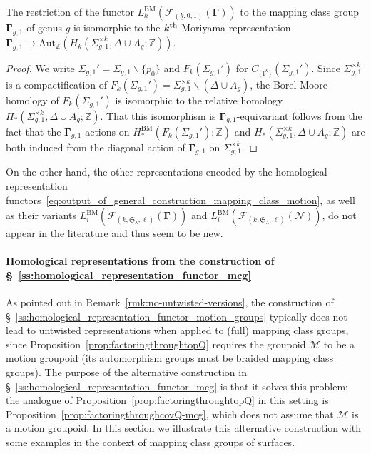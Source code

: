 \documentclass[AHL,Unicode,published]{cedram}
\newcommand{\Aut}{\mathrm{Aut}}
\newcommand{\BM}{\mathrm{BM}}
\newcommand{\MCGo}{\mathbf{\Gamma}}
\newcommand{\MCGno}{\boldsymbol{\mathcal{N}}}
\newcommand{\Sym}{\mathfrak{S}}
\newcommand{\cF}{\mathcal{F}}
\newcommand{\cM}{\mathcal{M}}
\newcommand{\bZ}{\mathbb{Z}}
\begin{document}
\begin{prop}\label{prop:Moriyama_recovering}
The restriction of the functor $L^{\BM}_{k}(\cF_{(\underline{k},0,1)}(\MCGo))$ to the mapping class group $\MCGo_{g,1}$ of genus $g$ is isomorphic to the $k^{\rm th}$ Moriyama representation $\MCGo_{g,1}\to\Aut_{\bZ}(H_{k}(\Sigma_{g,1}^{\times k}, \Delta \cup A_{g};\bZ))$.
\end{prop}


\begin{proof}
We write $\Sigma_{g,1}' = \Sigma_{g,1} \smallsetminus \{p_{0}\}$ and $F_{k}(\Sigma_{g,1}')$ for $C_{\boldsymbol{\{} 1^{k}\boldsymbol{\}}}(\Sigma_{g,1}')$. Since $\Sigma_{g,1}^{\times k}$ is a compactification of $F_{k}(\Sigma_{g,1}') = \Sigma_{g,1}^{\times k} \smallsetminus (\Delta \cup A_{g})$, the Borel-Moore homology of $F_{k}(\Sigma_{g,1}')$ is isomorphic to the relative homology $H_*(\Sigma_{g,1}^{\times k}, \Delta \cup A_{g};\bZ)$. That this isomorphism is $\MCGo_{g,1}$-equivariant follows from the fact that the $\MCGo_{g,1}$-actions on $H^{\BM}_{*}(F_{k}(\Sigma_{g,1}');\bZ)$ and $H_*(\Sigma_{g,1}^{\times k}, \Delta \cup A_{g};\bZ)$ are both induced from the diagonal action of $\MCGo_{g,1}$ on $\Sigma_{g,1}^{\times k}$.
\end{proof}

On the other hand, the other representations encoded by the homological representation functors~\eqref{eq:output_of_general_construction_mapping_class_motion}, as well as their variants $L^{\BM}_{i}(\cF_{(\underline{k},\Sym_{\lambda},\ell)}(\MCGo))$ and \newline $L^{\BM}_{i}(\cF_{(\underline{k},\Sym_{\lambda},\ell)}(\MCGno))$, do not appear in the literature and thus seem to be new.


\paragraph*{Homological representations from the construction of \S~\ref{ss:homological_representation_functor_mcg}}

As pointed out in Remark~\ref{rmk:no-untwisted-versions}, the construction of \S~\ref{ss:homological_representation_functor_motion_groups} typically does not lead to untwisted representations when applied to (full) mapping class groups, since Proposition~\ref{prop:factoringthroughtopQ} requires the groupoid $\cM$ to be a motion groupoid (its automorphism groups must be braided mapping class groups). The purpose of the alternative construction in \S~\ref{ss:homological_representation_functor_mcg} is that it solves this problem: the analogue of Proposition~\ref{prop:factoringthroughtopQ} in this setting is Proposition~\ref{prop:factoringthroughcovQ-mcg}, which does not assume that $\cM$ is a motion groupoid. In this section we illustrate this alternative construction with some examples in the context of mapping class groups of surfaces.
\end{document}
